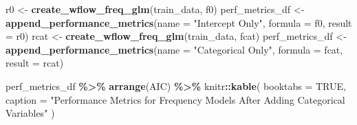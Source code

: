 \documentclass[
  english,
  11pt,
]{article}
\newenvironment{Shaded}{\begin{snugshade}}{\end{snugshade}}
\newcommand{\AttributeTok}[1]{\textcolor[rgb]{0.13,0.29,0.53}{#1}}
\newcommand{\ConstantTok}[1]{\textcolor[rgb]{0.56,0.35,0.01}{#1}}
\newcommand{\FunctionTok}[1]{\textcolor[rgb]{0.13,0.29,0.53}{\textbf{#1}}}
\newcommand{\NormalTok}[1]{#1}
\newcommand{\OtherTok}[1]{\textcolor[rgb]{0.56,0.35,0.01}{#1}}
\newcommand{\SpecialCharTok}[1]{\textcolor[rgb]{0.81,0.36,0.00}{\textbf{#1}}}
\newcommand{\StringTok}[1]{\textcolor[rgb]{0.31,0.60,0.02}{#1}}
\begin{document}
\begin{Shaded}
\begin{Highlighting}[]
\NormalTok{r0 }\OtherTok{\textless{}{-}} \FunctionTok{create\_wflow\_freq\_glm}\NormalTok{(train\_data, f0)}
\NormalTok{perf\_metrics\_df }\OtherTok{\textless{}{-}} \FunctionTok{append\_performance\_metrics}\NormalTok{(}\AttributeTok{name =} \StringTok{"Intercept Only"}\NormalTok{, }\AttributeTok{formula =}\NormalTok{ f0, }\AttributeTok{result =}\NormalTok{ r0)}
\NormalTok{rcat }\OtherTok{\textless{}{-}} \FunctionTok{create\_wflow\_freq\_glm}\NormalTok{(train\_data, fcat)}
\NormalTok{perf\_metrics\_df }\OtherTok{\textless{}{-}} \FunctionTok{append\_performance\_metrics}\NormalTok{(}\AttributeTok{name =} \StringTok{"Categorical Only"}\NormalTok{, }\AttributeTok{formula =}\NormalTok{ fcat, }\AttributeTok{result =}\NormalTok{ rcat)}

\NormalTok{perf\_metrics\_df }\SpecialCharTok{\%\textgreater{}\%} \FunctionTok{arrange}\NormalTok{(AIC) }\SpecialCharTok{\%\textgreater{}\%}\NormalTok{ knitr}\SpecialCharTok{::}\FunctionTok{kable}\NormalTok{(}
    \AttributeTok{booktabs =} \ConstantTok{TRUE}\NormalTok{, }\AttributeTok{caption =} \StringTok{"Performance Metrics for Frequency Models After Adding Categorical Variables"}
\NormalTok{)}
\end{Highlighting}
\end{Shaded}
\end{document}
